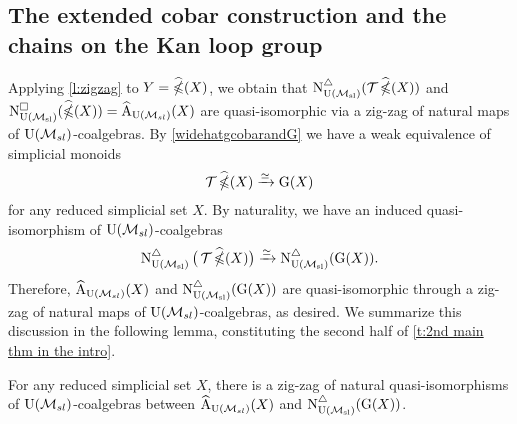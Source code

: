 \subsection{The extended cobar construction and the chains on the Kan loop group}

Applying \cref{l:zigzag} to $Y = \ccobarE(X)$, we obtain that $\schainsUSL (\triangulate \ccobarE(X))$ and $\cchainsUSL(\ccobarE(X)) = \adamsE_{\USL}(X)$ are quasi-isomorphic via a zig-zag of natural maps of $\USL$-coalgebras.
By \cref{widehatgcobarandG} we have a weak equivalence of simplicial monoids
\[
\triangulate \ccobarE(X) \xrightarrow{\simeq} \kan(X)
\]
for any reduced simplicial set $X$.
By naturality, we have an induced quasi-isomorphism of $\USL$-coalgebras
\[
\schainsUSL \big( \triangulate \ccobarE(X) \big) \xra{\simeq}
\schainsUSL (\kan(X)).
\]
Therefore, $\adamsE_{\USL}(X)$ and $\schainsUSL(\kan(X))$ are quasi-isomorphic through a zig-zag of natural maps of $\USL$-coalgebras, as desired.
We summarize this discussion in the following lemma, constituting the second half of \cref{t:2nd main thm in the intro}.

\begin{lemma}\label{l:AhatandGX}
	For any reduced simplicial set $X$, there is a zig-zag of natural quasi-isomorphisms of $\USL$-coalgebras between $\adamsE_\USL(X)$ and $\schainsUSL(\kan(X))$.
\end{lemma}